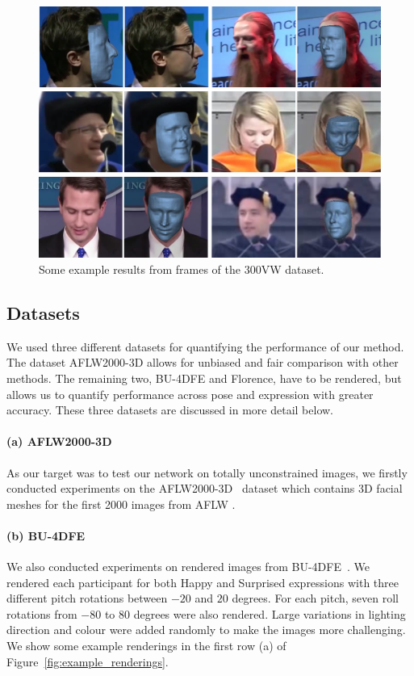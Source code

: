 \begin{figure}
  \centering
  \includegraphics[width=0.9\linewidth]{img/300vw.png}
  \caption[Visual results on the 300VW dataset]{Some example results
    from frames of the 300VW dataset.}
  \label{fig:face300vw}
\end{figure}

\subsection{Datasets}

We used three different datasets for quantifying the performance of
our method. The dataset AFLW2000-3D allows for unbiased and fair
comparison with other methods. The remaining two, BU-4DFE and
Florence, have to be rendered, but allows us to quantify performance
across pose and expression with greater accuracy. These three datasets
are discussed in more detail below.

\paragraph{(a) AFLW2000-3D} As our target was to test
our network on totally unconstrained images, we firstly conducted
experiments on the AFLW2000-3D~\cite{zhu2016face} dataset which
contains 3D facial meshes for the first 2000 images from AFLW
\cite{aflw2011}.

\paragraph{(b) BU-4DFE} We also conducted experiments on rendered
images from BU-4DFE~\cite{yin2008high}. We rendered each participant
for both Happy and Surprised expressions with three different pitch
rotations between $-20$ and $20$ degrees. For each pitch, seven roll
rotations from $-80$ to $80$ degrees were also rendered. Large
variations in lighting direction and colour were added randomly to
make the images more challenging. We show some example renderings in
the first row (a) of Figure~\ref{fig:example_renderings}.

